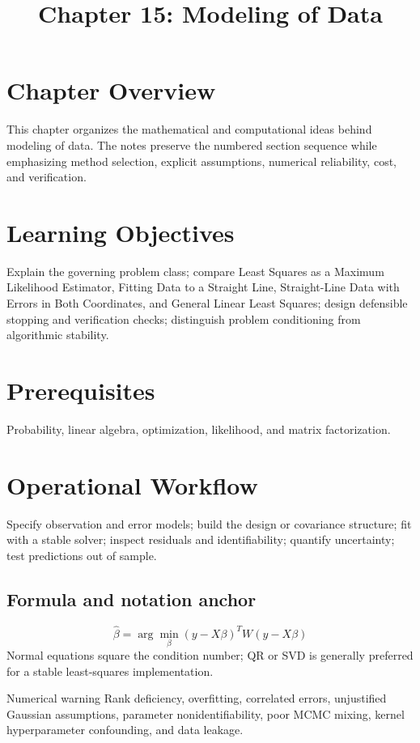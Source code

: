 \documentclass[10pt,letterpaper]{article}
\title{Chapter 15: Modeling of Data}
\author{}
\date{}
\begin{document}
\maketitle

\section*{Chapter Overview}
This chapter organizes the mathematical and computational ideas behind modeling of data. The notes preserve the numbered section sequence while emphasizing method selection, explicit assumptions, numerical reliability, cost, and verification.

\section*{Learning Objectives}
Explain the governing problem class; compare Least Squares as a Maximum Likelihood Estimator, Fitting Data to a Straight Line, Straight-Line Data with Errors in Both Coordinates, and General Linear Least Squares; design defensible stopping and verification checks; distinguish problem conditioning from algorithmic stability.

\section*{Prerequisites}
Probability, linear algebra, optimization, likelihood, and matrix factorization.

\section*{Operational Workflow}
Specify observation and error models; build the design or covariance structure; fit with a stable solver; inspect residuals and identifiability; quantify uncertainty; test predictions out of sample.

\subsection*{Formula and notation anchor}
\[
\widehat{\beta}=\arg\min_{\beta}(y-X\beta)^T W(y-X\beta)
\]
Normal equations square the condition number; QR or SVD is generally preferred for a stable least-squares implementation.

\begin{warnbox}{Numerical warning}
Rank deficiency, overfitting, correlated errors, unjustified Gaussian assumptions, parameter nonidentifiability, poor MCMC mixing, kernel hyperparameter confounding, and data leakage.
\end{warnbox}
\end{document}
